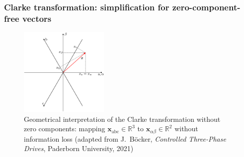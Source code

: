 \begin{frame}
	\frametitle{Clarke transformation: simplification for zero-component-free vectors}
    \begin{figure}
        \centering
        \includegraphics[width=0.38\textwidth]{fig/lec06/abc_alphabeta_vectors.pdf}
        \caption{Geometrical interpretation of the Clarke
        transformation without zero components: mapping $\bm{x}_\mathrm{abc}\in\mathbb{R}^3$ to $\bm{x}_{\alpha\beta}\in\mathbb{R}^2$ without information loss (adapted from J.~B\"ocker, \textit{Controlled Three-Phase Drives}, Paderborn University, 2021)}
        \label{fig:abc_alphabeta_vectors}
    \end{figure}    
\end{frame}


